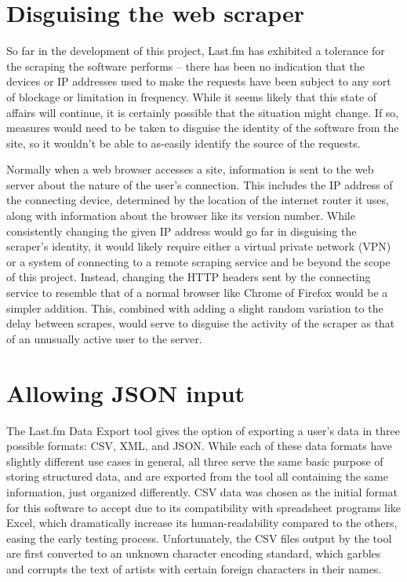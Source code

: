 \section{Disguising the web scraper}\label{disguise}

So far in the development of this project, Last.fm has exhibited a tolerance for the scraping the software performs -- there has been no indication that the devices or IP addresses used to make the requests have been subject to any sort of blockage or limitation in frequency. While it seems likely that this state of affairs will continue, it is certainly possible that the situation might change. If so, measures would need to be taken to disguise the identity of the software from the site, so it wouldn't be able to as-easily identify the source of the requests.

Normally when a web browser accesses a site, information is sent to the web server about the nature of the user's connection. This includes the IP address of the connecting device, determined by the location of the internet router it uses, along with information about the browser like its version number. While consistently changing the given IP address would go far in disguising the scraper's identity, it would likely require either a virtual private network (VPN) or a system of connecting to a remote scraping service and be beyond the scope of this project. Instead, changing the HTTP headers sent by the connecting service to resemble that of a normal browser like Chrome of Firefox would be a simpler addition. This, combined with adding a slight random variation to the delay between scrapes, would serve to disguise the activity of the scraper as that of an unusually active user to the server.


\section{Allowing JSON input}\label{jsonin}

The Last.fm Data Export tool gives the option of exporting a user's data in three possible formats: CSV, XML, and JSON. While each of these data formats have slightly different use cases in general, all three serve the same basic purpose of storing structured data, and are exported from the tool all containing the same information, just organized differently. CSV data was chosen as the initial format for this software to accept due to its compatibility with spreadsheet programs like Excel, which dramatically increase its human-readability compared to the others, easing the early testing process. Unfortunately, the CSV files output by the tool are first converted to an unknown character encoding standard, which garbles and corrupts the text of artists with certain foreign characters in their names.

